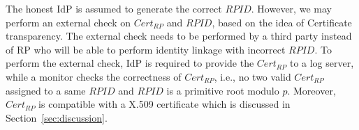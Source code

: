 The honest IdP is assumed to generate the correct $RPID$. However, we may perform an external check on $Cert_{RP}$ and $RPID$, based on the idea of Certificate transparency. The external check needs to be performed by a third party instead of RP who will be able to perform identity linkage with incorrect $RPID$. To perform the external check, IdP is required to provide the $Cert_{RP}$ to a log server, while a monitor checks the correctness of $Cert_{RP}$, i.e., no two valid $Cert_{RP}$ assigned to a same $RPID$ and $RPID$ is a primitive root modulo $p$. Moreover, $Cert_{RP}$ is compatible with a X.509 certificate which is discussed in Section~\ref{sec:discussion}.

